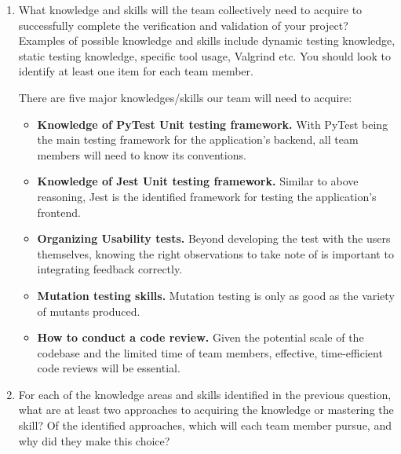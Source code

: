 \documentclass[12pt, titlepage]{article}
\begin{document}
\begin{enumerate}
  \item What knowledge and skills will the team collectively need to acquire to
  successfully complete the verification and validation of your project?
  Examples of possible knowledge and skills include dynamic testing knowledge,
  static testing knowledge, specific tool usage, Valgrind etc.  You should look to
  identify at least one item for each team member.

  There are five major knowledges/skills our team will need to acquire:

  \begin{itemize}
    \item \textbf{Knowledge of PyTest Unit testing framework.} With PyTest being the main testing framework for the application's backend, 
    all team members will need to know its conventions.
    \item \textbf{Knowledge of Jest Unit testing framework.} Similar to above reasoning, Jest is the identified framework for testing
    the application's frontend.
    \item \textbf{Organizing Usability tests.} Beyond developing the test with the users themselves, knowing the right observations to take 
    note of is important to integrating feedback correctly.
    \item \textbf{Mutation testing skills.} Mutation testing is only as good as the variety of mutants produced.
    \item \textbf{How to conduct a code review.} Given the potential scale of the codebase and the limited time of team members, effective,
    time-efficient code reviews will be essential.
  \end{itemize}

  \item For each of the knowledge areas and skills identified in the previous
  question, what are at least two approaches to acquiring the knowledge or
  mastering the skill?  Of the identified approaches, which will each team
  member pursue, and why did they make this choice?


\end{enumerate}
\end{document}

